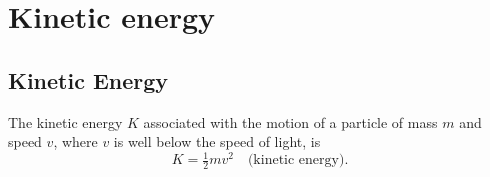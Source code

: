 \section{Kinetic energy}
\subsection{Kinetic Energy}
The kinetic energy $K$ associated with the motion of a particle of mass $m$ and speed $v$, where $v$ is well below the speed of light, is
\[
K = \tfrac{1}{2}mv^2 \quad \text{(kinetic energy).}
\]
